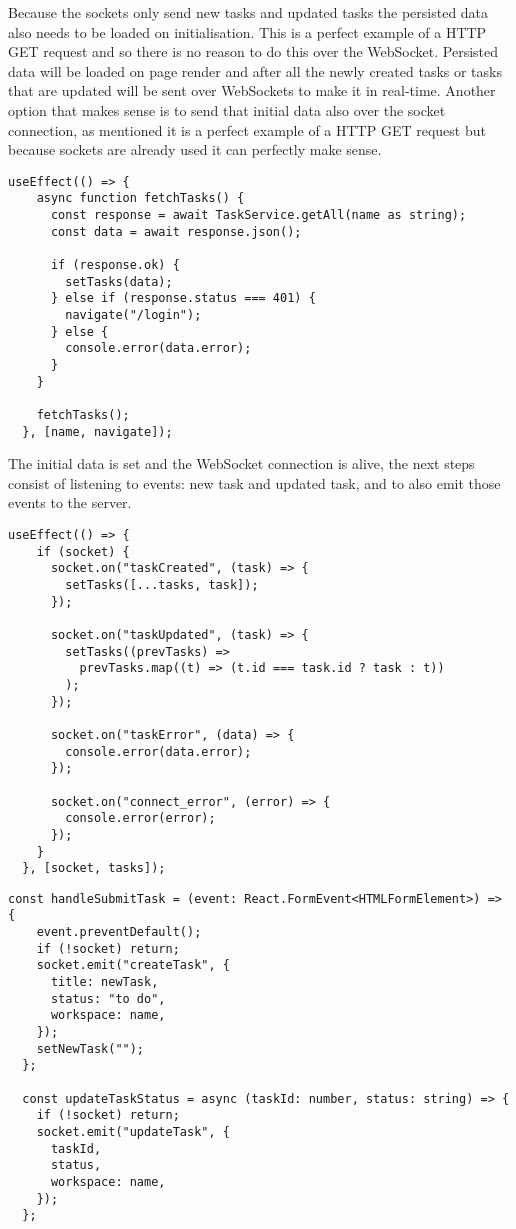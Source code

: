 Because the sockets only send new tasks and updated tasks the persisted data also needs to be loaded on initialisation. This is a perfect example of a HTTP GET request and so there is no reason to do this over the WebSocket. Persisted data will be loaded on page render and after all the newly created tasks or tasks that are updated will be sent over WebSockets to make it in real-time. Another option that makes sense is to send that initial data also over the socket connection, as mentioned it is a perfect example of a HTTP GET request but because sockets are already used it can perfectly make sense.

\begin{lstlisting}[caption=Loading persisted data]
  useEffect(() => {
    async function fetchTasks() {
      const response = await TaskService.getAll(name as string);
      const data = await response.json();
 
      if (response.ok) {
        setTasks(data);
      } else if (response.status === 401) {
        navigate("/login");
      } else {
        console.error(data.error);
      }
    }
 
    fetchTasks();
  }, [name, navigate]);
\end{lstlisting}

The initial data is set and the WebSocket connection is alive, the next steps consist of listening to events: new task and updated task, and to also emit those events to the server.

\begin{lstlisting}[caption=Listening to events]
  useEffect(() => {
    if (socket) {
      socket.on("taskCreated", (task) => {
        setTasks([...tasks, task]);
      });
 
      socket.on("taskUpdated", (task) => {
        setTasks((prevTasks) =>
          prevTasks.map((t) => (t.id === task.id ? task : t))
        );
      });
 
      socket.on("taskError", (data) => {
        console.error(data.error);
      });
 
      socket.on("connect_error", (error) => {
        console.error(error);
      });
    }
  }, [socket, tasks]);
\end{lstlisting}

\begin{lstlisting}[caption=Sending events]
  const handleSubmitTask = (event: React.FormEvent<HTMLFormElement>) => {
    event.preventDefault();
    if (!socket) return;
    socket.emit("createTask", {
      title: newTask,
      status: "to do",
      workspace: name,
    });
    setNewTask("");
  };
 
  const updateTaskStatus = async (taskId: number, status: string) => {
    if (!socket) return;
    socket.emit("updateTask", {
      taskId,
      status,
      workspace: name,
    });
  };
\end{lstlisting}

